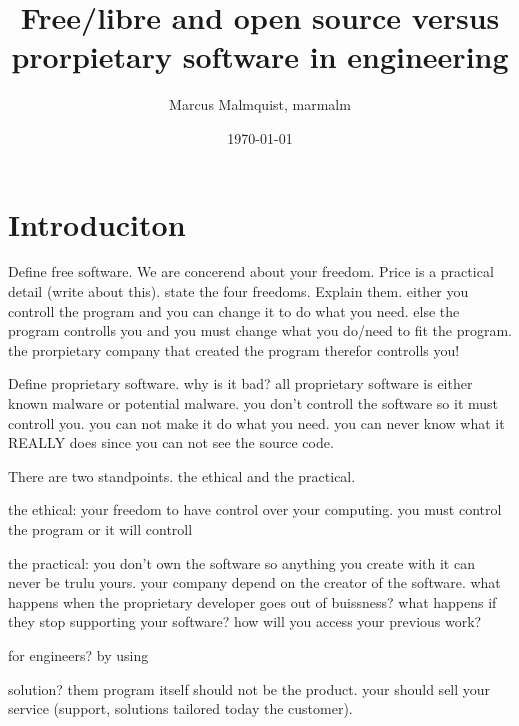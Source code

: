 \documentclass[12pt,a4paper]{article}
\title{Free/libre and open source versus prorpietary software in engineering}
\author{Marcus Malmquist, marmalm}
\date{\today}
\begin{document}
\maketitle

\section{Introduciton}
Define free software. We are concerend about your freedom. Price is a practical detail (write about this). state the four freedoms. Explain them. either you controll the program and you can change it to do what you need. else the program controlls you and you must change what you do/need to fit the program. the prorpietary company that created the program therefor controlls you!

Define proprietary software. why is it bad? all proprietary software is either known malware or potential malware. you don't controll the software so it must controll you. you can not make it do what you need. you can never know what it REALLY does since you can not see the source code.

There are two standpoints. the ethical and the practical.

the ethical: your freedom to have control over your computing. you must control the program or it will controll

the practical: you don't own the software so anything you create with it can never be trulu yours. your company depend on the creator of the software. what happens when the proprietary developer goes out of buissness? what happens if they stop supporting your software? how will you access your previous work?

for engineers? by using

solution? them program itself should not be the product. your should sell your service (support, solutions tailored today the customer).
\end{document}
